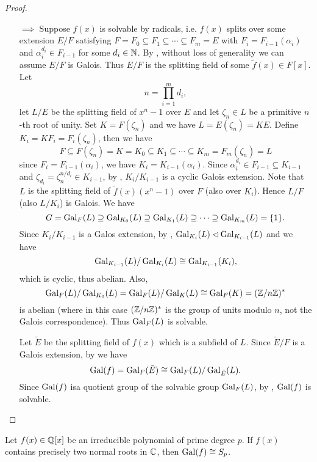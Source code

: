 \documentclass[11pt]{article}
\begin{document}
\begin{proof}
\begin{itemize}
        \item[$\implies$] Suppose $f(x)$ is solvable by radicals, i.e. $f(x)$ splits over some extension $E/F$ satisfying $F=F_0\subseteq F_1\subseteq\cdots\subseteq F_m=E$ with $F_i=F_{i-1}(\alpha_i)$ and $\alpha_i^{d_i}\in F_{i-1}$ for some $d_i\in\mathbb{N}$. By , without loss of generality we can assume $E/F$ is Galois. Thus $E/F$ is the splitting field of some $\tilde{f}(x)\in F[x]$. Let
        \[n=\prod_{i=1}^m d_i,\]
        let $L/E$ be the splitting field of $x^n-1$ over $E$ and let $\zeta_n\in L$ be a primitive $n$-th root of unity. Set $K=F(\zeta_n)$ and we have $L=E(\zeta_n)=KE$. Define $K_i=KF_i=F_i(\zeta_n)$, then we have
        \[F\subseteq F(\zeta_n)=K=K_0\subseteq K_1\subseteq\cdots\subseteq K_m=F_m(\zeta_n)=L\]
        since $F_i=F_{i-1}(\alpha_i)$, we have $K_i=K_{i-1}(\alpha_i)$. Since $\alpha_i^{d_i}\in F_{i-1}\subseteq K_{i-1}$ and $\zeta_{d_i}=\zeta_n^{n/d_i}\in K_{i-1}$, by , $K_i/K_{i-1}$ is a cyclic Galois extension. Note that $L$ is the splitting field of $\tilde{f}(x)(x^n-1)$ over $F$ (also over $K_i$). Hence $L/F$ (also $L/K_i$) is Galois. We have
        \[G=\operatorname{Gal}_F(L)\supseteq\operatorname{Gal}_{K_0}(L)\supseteq\operatorname{Gal}_{K_1}(L)\supseteq\cdots\supseteq\operatorname{Gal}_{K_m}(L)=\{1\}.\]
        Since $K_i/K_{i-1}$ is a Galos extension, by , $\operatorname{Gal}_{K_i}(L)\lhd\operatorname{Gal}_{K_{i-1}}(L)$ and we have
        \[\operatorname{Gal}_{K_{i-1}}(L)/\operatorname{Gal}_{K_i}(L)\cong\operatorname{Gal}_{K_{i-1}}(K_i),\]
        which is cyclic, thus abelian. Also,
        \[\operatorname{Gal}_F(L)/\operatorname{Gal}_{K_0}(L)=\operatorname{Gal}_F(L)/\operatorname{Gal}_K(L)\cong\operatorname{Gal}_F(K)=(\mathbb{Z}/n\mathbb{Z})^*\]
        is abelian (where in this case $(\mathbb{Z}/n\mathbb{Z})^*$ is the group of units modulo $n$, not the Galois correspondence). Thus $\operatorname{Gal}_F(L)$ is solvable.

        Let $\tilde{E}$ be the splitting field of $f(x)$ which is a subfield of $L$. Since $\tilde{E}/F$ is a Galois extension, by  we have
        \[\operatorname{Gal}(f)=\operatorname{Gal}_F(\tilde{E})\cong\operatorname{Gal}_F(L)/\operatorname{Gal}_{\tilde{E}}(L).\]
        Since $\operatorname{Gal}(f)$ isa quotient group of the solvable group $\operatorname{Gal}_F(L)$, by , $\operatorname{Gal}(f)$ is solvable.
    \end{itemize}
\end{proof}

\begin{proposition}
    Let $f(x)\in\mathbb{Q}[x]$ be an irreducible polynomial of prime degree $p$. If $f(x)$ contains precisely two normal roots in $\mathbb{C}$, then $\operatorname{Gal}(f)\cong S_p$.
\end{proposition}
\end{document}
